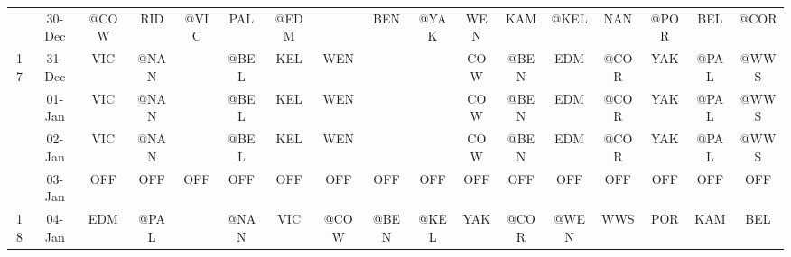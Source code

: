 \begin{table}[htbp]
\begin{tabular}{ccrrrrrrrrrrrrrrr}
          & 30-Dec & \multicolumn{1}{c}{@COW} & \multicolumn{1}{c}{RID} & \multicolumn{1}{c}{@VIC} & \multicolumn{1}{c}{PAL} & \multicolumn{1}{c}{@EDM} &       & \multicolumn{1}{c}{BEN} & \multicolumn{1}{c}{@YAK} & \multicolumn{1}{c}{WEN} & \multicolumn{1}{c}{KAM} & \multicolumn{1}{c}{@KEL} & \multicolumn{1}{c}{NAN} & \multicolumn{1}{c}{@POR} & \multicolumn{1}{c}{BEL} & \multicolumn{1}{c}{@COR} \\
    17    & 31-Dec & \multicolumn{1}{c}{VIC} & \multicolumn{1}{c}{\cellcolor[rgb]{ .588,  .588,  .588}@NAN} &       & \multicolumn{1}{c}{\cellcolor[rgb]{ .588,  .588,  .588}@BEL} & \multicolumn{1}{c}{KEL} & \multicolumn{1}{c}{WEN} &       &       & \multicolumn{1}{c}{COW} & \multicolumn{1}{c}{@BEN} & \multicolumn{1}{c}{EDM} & \multicolumn{1}{c}{@COR} & \multicolumn{1}{c}{YAK} & \multicolumn{1}{c}{\cellcolor[rgb]{ .588,  .588,  .588}@PAL} & \multicolumn{1}{c}{@WWS} \\
          & 01-Jan & \multicolumn{1}{c}{VIC} & \multicolumn{1}{c}{\cellcolor[rgb]{ .588,  .588,  .588}@NAN} &       & \multicolumn{1}{c}{\cellcolor[rgb]{ .588,  .588,  .588}@BEL} & \multicolumn{1}{c}{KEL} & \multicolumn{1}{c}{WEN} &       &       & \multicolumn{1}{c}{COW} & \multicolumn{1}{c}{@BEN} & \multicolumn{1}{c}{EDM} & \multicolumn{1}{c}{@COR} & \multicolumn{1}{c}{YAK} & \multicolumn{1}{c}{\cellcolor[rgb]{ .588,  .588,  .588}@PAL} & \multicolumn{1}{c}{@WWS} \\
          & 02-Jan & \multicolumn{1}{c}{VIC} & \multicolumn{1}{c}{\cellcolor[rgb]{ .588,  .588,  .588}@NAN} &       & \multicolumn{1}{c}{\cellcolor[rgb]{ .588,  .588,  .588}@BEL} & \multicolumn{1}{c}{KEL} & \multicolumn{1}{c}{WEN} &       &       & \multicolumn{1}{c}{COW} & \multicolumn{1}{c}{@BEN} & \multicolumn{1}{c}{EDM} & \multicolumn{1}{c}{@COR} & \multicolumn{1}{c}{YAK} & \multicolumn{1}{c}{\cellcolor[rgb]{ .588,  .588,  .588}@PAL} & \multicolumn{1}{c}{@WWS} \\
          & 03-Jan & \multicolumn{1}{c}{OFF} & \multicolumn{1}{c}{OFF} & \multicolumn{1}{c}{OFF} & \multicolumn{1}{c}{OFF} & \multicolumn{1}{c}{OFF} & \multicolumn{1}{c}{OFF} & \multicolumn{1}{c}{OFF} & \multicolumn{1}{c}{OFF} & \multicolumn{1}{c}{OFF} & \multicolumn{1}{c}{OFF} & \multicolumn{1}{c}{OFF} & \multicolumn{1}{c}{OFF} & \multicolumn{1}{c}{OFF} & \multicolumn{1}{c}{OFF} & \multicolumn{1}{c}{OFF} \\
    18    & 04-Jan & \multicolumn{1}{c}{EDM} & \multicolumn{1}{c}{@PAL} &       & \multicolumn{1}{c}{@NAN} & \multicolumn{1}{c}{VIC} & \multicolumn{1}{c}{@COW} & \multicolumn{1}{c}{@BEN} & \multicolumn{1}{c}{@KEL} & \multicolumn{1}{c}{YAK} & \multicolumn{1}{c}{@COR} & \multicolumn{1}{c}{@WEN} & \multicolumn{1}{c}{WWS} & \multicolumn{1}{c}{POR} & \multicolumn{1}{c}{KAM} & \multicolumn{1}{c}{BEL} \\

\end{tabular}
\end{table}
